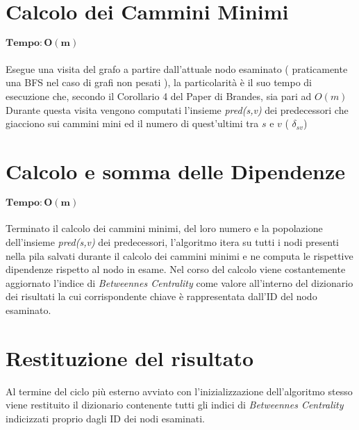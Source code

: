 \section{Calcolo dei Cammini Minimi}
$\mathbf{Tempo: O(m)}$\\ 	\\
Esegue una visita del grafo a partire dall'attuale nodo esaminato ( praticamente una BFS nel caso di grafi non pesati ), la particolarità è il suo tempo di esecuzione che, secondo il Corollario 4 del Paper di Brandes, sia pari ad $O(m)$
Durante questa visita vengono computati l'insieme \emph{pred(s,v)} dei predecessori che giacciono sui cammini mini ed il numero di quest'ultimi tra $s$ e $v$ ( $\delta_{sv}$)

\section{Calcolo e somma delle Dipendenze}
$\mathbf{Tempo: O(m)}$\\ 	\\
Terminato il calcolo dei cammini minimi, del loro numero e la popolazione dell'insieme \emph{pred(s,v)} dei predecessori,  l'algoritmo itera su tutti i nodi presenti nella pila salvati durante il calcolo dei cammini minimi e ne computa le rispettive dipendenze rispetto al nodo in esame. Nel corso del calcolo viene costantemente aggiornato l'indice di \emph{Betweennes Centrality} come valore all'interno del dizionario dei risultati la cui corrispondente chiave è rappresentata dall'ID del nodo esaminato.

\section{Restituzione del risultato}
Al termine del ciclo più esterno avviato con l'inizializzazione dell'algoritmo stesso viene restituito il dizionario contenente tutti gli indici di \emph{Betweennes Centrality} indicizzati proprio dagli ID dei nodi esaminati.

